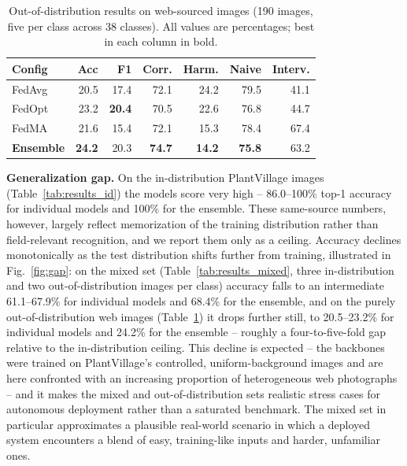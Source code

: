 \documentclass[conference]{IEEEtran}
\begin{document}
\begin{table}[t]
\centering
\caption{Out-of-distribution results on web-sourced images (190 images, five per class across 38 classes). All values are percentages; best in each column in bold.}
\label{tab:results_ood}
\small
\setlength{\tabcolsep}{4pt}
\begin{tabular}{lrrrrrr}
\toprule
\textbf{Config} & \textbf{Acc} & \textbf{F1} & \textbf{Corr.} & \textbf{Harm.} & \textbf{Naive} & \textbf{Interv.} \\
\midrule
FedAvg & 20.5 & 17.4 & 72.1 & 24.2 & 79.5 & 41.1 \\
FedOpt & 23.2 & \textbf{20.4} & 70.5 & 22.6 & 76.8 & 44.7 \\
FedMA & 21.6 & 15.4 & 72.1 & 15.3 & 78.4 & 67.4 \\
\textbf{Ensemble} & \textbf{24.2} & 20.3 & \textbf{74.7} & \textbf{14.2} & \textbf{75.8} & 63.2 \\
\bottomrule
\end{tabular}
\end{table}

\textbf{Generalization gap.} On the in-distribution PlantVillage images (Table~\ref{tab:results_id}) the models score very high -- 86.0--100\% top-1 accuracy for individual models and 100\% for the ensemble. These same-source numbers, however, largely reflect memorization of the training distribution rather than field-relevant recognition, and we report them only as a ceiling. Accuracy declines monotonically as the test distribution shifts further from training, illustrated in Fig.~\ref{fig:gap}: on the mixed set (Table~\ref{tab:results_mixed}, three in-distribution and two out-of-distribution images per class) accuracy falls to an intermediate 61.1--67.9\% for individual models and 68.4\% for the ensemble, and on the purely out-of-distribution web images (Table~\ref{tab:results_ood}) it drops further still, to 20.5--23.2\% for individual models and 24.2\% for the ensemble -- roughly a four-to-five-fold gap relative to the in-distribution ceiling. This decline is expected -- the backbones were trained on PlantVillage's controlled, uniform-background images and are here confronted with an increasing proportion of heterogeneous web photographs -- and it makes the mixed and out-of-distribution sets realistic stress cases for autonomous deployment rather than a saturated benchmark. The mixed set in particular approximates a plausible real-world scenario in which a deployed system encounters a blend of easy, training-like inputs and harder, unfamiliar ones.
\end{document}
